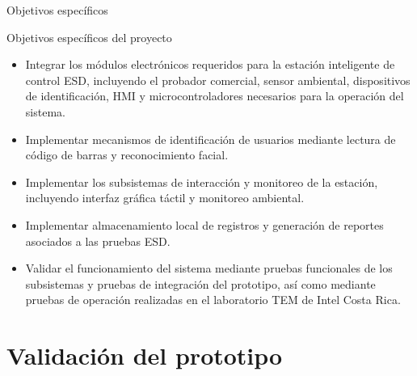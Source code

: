 \documentclass[aspectratio=169]{beamer}
\newcommand{\rightfootertext}{}
\newcommand{\setrightfooter}[1]{\gdef\rightfootertext{#1}}
\begin{document}
\begin{frame}{Objetivos específicos}

    \begin{block}{Objetivos específicos del proyecto}
    \small
    \begin{itemize}

        \item Integrar los módulos electrónicos requeridos para la estación inteligente de control ESD, incluyendo el 
        probador comercial, sensor ambiental, dispositivos de identificación, HMI y microcontroladores necesarios para la operación del sistema.

        \item Implementar mecanismos de identificación de usuarios mediante lectura de código de barras y reconocimiento facial.

        \item Implementar los subsistemas de interacción y monitoreo de la estación, incluyendo interfaz gráfica 
        táctil y monitoreo ambiental.

        \item Implementar almacenamiento local de registros y generación de reportes asociados a las pruebas ESD.

        \item Validar el funcionamiento del sistema mediante pruebas funcionales de los subsistemas 
        y pruebas de integración del prototipo, así como mediante pruebas de operación realizadas 
        en el laboratorio TEM de Intel Costa Rica.

    \end{itemize}
    \end{block}

\end{frame}


\section{Validación del prototipo}
\setrightfooter{}
\end{document}
